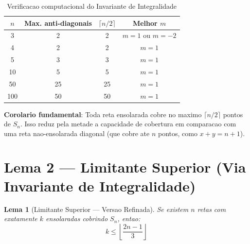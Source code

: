 \documentclass[5p]{elsarticle}
\newtheorem{lemma}{Lema}[section]
\theoremstyle{definition}
\begin{document}
\begin{table}[H]
  \centering
  \caption{Verificacao computacional do Invariante de Integralidade}
  \label{tab:integrality}
  \begin{tabular}{cccc}
    \toprule
    $n$ & Max. anti-diagonais & $\lceil n/2 \rceil$ & Melhor $m$ \\
    \midrule
    3 & 2 & 2 & $m = 1$ ou $m = -2$ \\
    4 & 2 & 2 & $m = 1$ \\
    5 & 3 & 3 & $m = 1$ \\
    10 & 5 & 5 & $m = 1$ \\
    50 & 25 & 25 & $m = 1$ \\
    100 & 50 & 50 & $m = 1$ \\
    \bottomrule
  \end{tabular}
\end{table}

\textbf{Corolario fundamental}: Toda reta ensolarada cobre no maximo $\lceil n/2 \rceil$
pontos de $S_n$. Isso reduz pela metade a capacidade de cobertura em comparacao com
uma reta nao-ensolarada diagonal (que cobre ate $n$ pontos, como $x+y = n+1$).

\section{Lema 2 — Limitante Superior (Via Invariante de Integralidade)}

\begin{lemma}[Limitante Superior — Versao Refinada]\label{lem:upper}
  Se existem $n$ retas com exatamente $k$ ensolaradas cobrindo $S_n$, entao:
  \begin{equation}\label{eq:upper}
    k \leq \left\lfloor \frac{2n-1}{3} \right\rfloor
  \end{equation}
\end{lemma}
\end{document}
